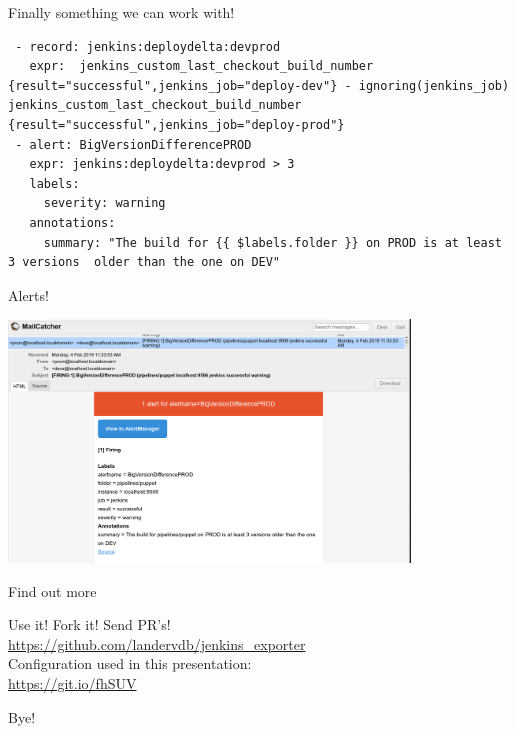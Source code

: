 \documentclass[aspectratio=169,12pt]{beamer}
\begin{document}
\begin{frame}[fragile]{Finally something we can work with!}
  \begin{verbatim}
 - record: jenkins:deploydelta:devprod
   expr:  jenkins_custom_last_checkout_build_number {result="successful",jenkins_job="deploy-dev"} - ignoring(jenkins_job) jenkins_custom_last_checkout_build_number {result="successful",jenkins_job="deploy-prod"}
 - alert: BigVersionDifferencePROD
   expr: jenkins:deploydelta:devprod > 3
   labels:
     severity: warning
   annotations:
     summary: "The build for {{ $labels.folder }} on PROD is at least 3 versions  older than the one on DEV"
  \end{verbatim}
\end{frame}

\begin{frame}{Alerts!}
  \begin{center}
    \includegraphics[width=0.8\textwidth]{img/alerts.png}
  \end{center}
\end{frame}

\begin{frame}[fragile]{Find out more}
  \begin{center}
    Use it! Fork it! Send PR's! \\ 
    \url{https://github.com/landervdb/jenkins_exporter} \\ 
    \vspace{20pt}
    Configuration used in this presentation: \\
    \url{https://git.io/fhSUV}
  \end{center}
\end{frame}

\begin{frame}[standout]
  Bye!
\end{frame}
\end{document}
